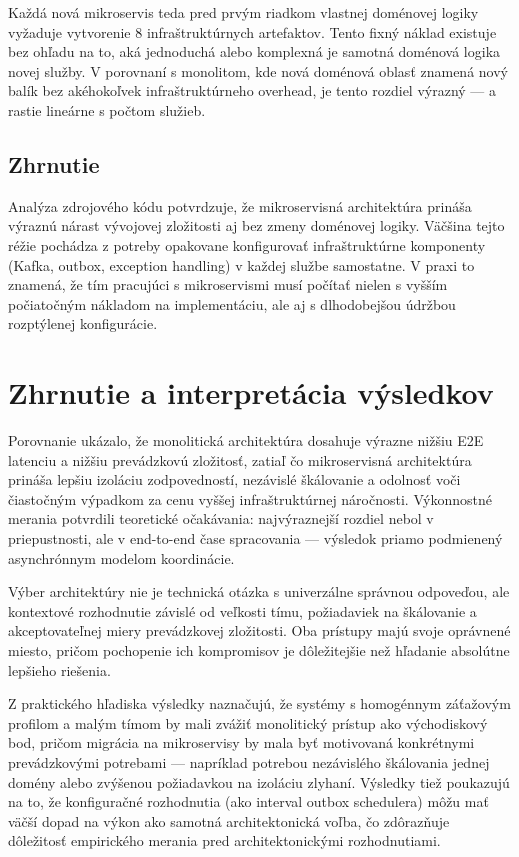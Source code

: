 Každá nová mikroservis teda pred prvým riadkom vlastnej doménovej logiky vyžaduje vytvorenie 8 infraštruktúrnych artefaktov. Tento fixný náklad existuje bez ohľadu na to, aká jednoduchá alebo komplexná je samotná doménová logika novej služby. V porovnaní s monolitom, kde nová doménová oblasť znamená nový balík bez akéhokoľvek infraštruktúrneho overhead, je tento rozdiel výrazný — a rastie lineárne s počtom služieb.

\subsection*{Zhrnutie}

Analýza zdrojového kódu potvrdzuje, že mikroservisná architektúra prináša výraznú nárast vývojovej zložitosti aj bez zmeny doménovej logiky. Väčšina tejto réžie pochádza z potreby opakovane konfigurovať infraštruktúrne komponenty (Kafka, outbox, exception handling) v každej službe samostatne. V praxi to znamená, že tím pracujúci s mikroservismi musí počítať nielen s vyšším počiatočným nákladom na implementáciu, ale aj s dlhodobejšou údržbou rozptýlenej konfigurácie.

\section{Zhrnutie a interpretácia výsledkov}

Porovnanie ukázalo, že monolitická architektúra dosahuje výrazne nižšiu E2E latenciu a nižšiu prevádzkovú zložitosť, zatiaľ čo mikroservisná architektúra prináša lepšiu izoláciu zodpovedností, nezávislé škálovanie a odolnosť voči čiastočným výpadkom za cenu vyššej infraštruktúrnej náročnosti. Výkonnostné merania potvrdili teoretické očakávania: najvýraznejší rozdiel nebol v priepustnosti, ale v end-to-end čase spracovania — výsledok priamo podmienený asynchrónnym modelom koordinácie.

Výber architektúry nie je technická otázka s univerzálne správnou odpoveďou, ale kontextové rozhodnutie závislé od veľkosti tímu, požiadaviek na škálovanie a akceptovateľnej miery prevádzkovej zložitosti. Oba prístupy majú svoje oprávnené miesto, pričom pochopenie ich kompromisov je dôležitejšie než hľadanie absolútne lepšieho riešenia.

Z praktického hľadiska výsledky naznačujú, že systémy s homogénnym záťažovým profilom a malým tímom by mali zvážiť monolitický prístup ako východiskový bod, pričom migrácia na mikroservisy by mala byť motivovaná konkrétnymi prevádzkovými potrebami — napríklad potrebou nezávislého škálovania jednej domény alebo zvýšenou požiadavkou na izoláciu zlyhaní. Výsledky tiež poukazujú na to, že konfiguračné rozhodnutia (ako interval outbox schedulera) môžu mať väčší dopad na výkon ako samotná architektonická voľba, čo zdôrazňuje dôležitosť empirického merania pred architektonickými rozhodnutiami.
